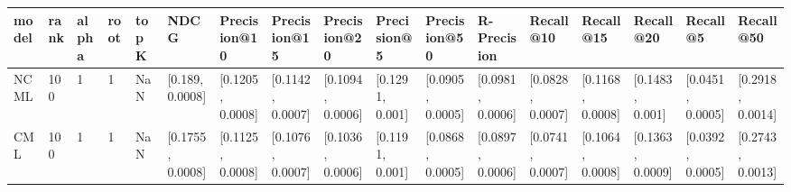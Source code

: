 \begin{tabular}{lllllllllllllllll}
\toprule
model & rank & alpha & root & topK &              NDCG &      Precision@10 &      Precision@15 &      Precision@20 &      Precision@5 &      Precision@50 &       R-Precision &         Recall@10 &         Recall@15 &         Recall@20 &          Recall@5 &         Recall@50 \\
\midrule
 NCML &  100 &     1 &    1 &  NaN &   [0.189, 0.0008] &  [0.1205, 0.0008] &  [0.1142, 0.0007] &  [0.1094, 0.0006] &  [0.1291, 0.001] &  [0.0905, 0.0005] &  [0.0981, 0.0006] &  [0.0828, 0.0007] &  [0.1168, 0.0008] &   [0.1483, 0.001] &  [0.0451, 0.0005] &  [0.2918, 0.0014] \\
  CML &  100 &     1 &    1 &  NaN &  [0.1755, 0.0008] &  [0.1125, 0.0008] &  [0.1076, 0.0007] &  [0.1036, 0.0006] &  [0.1191, 0.001] &  [0.0868, 0.0005] &  [0.0897, 0.0006] &  [0.0741, 0.0007] &  [0.1064, 0.0008] &  [0.1363, 0.0009] &  [0.0392, 0.0005] &  [0.2743, 0.0013] \\
\bottomrule
\end{tabular}
